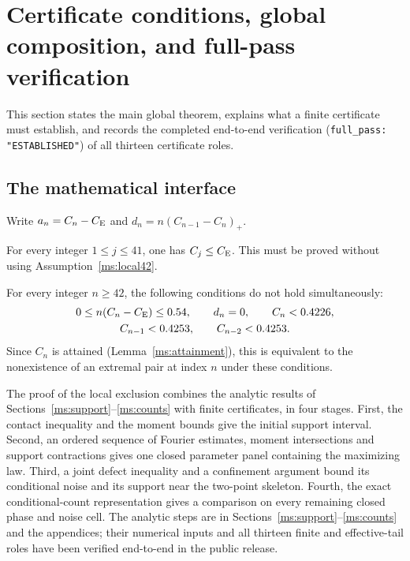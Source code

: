 \section{Certificate conditions, global composition, and full-pass verification}\label{ms:certificates}

This section states the main global theorem, explains what a
finite certificate must establish, and records the completed end-to-end
verification (\texttt{full\_pass: "ESTABLISHED"}) of all thirteen certificate
roles.

\subsection{The mathematical interface}

Write $a_n=C_n-C_{\mathrm E}$ and
$d_n=n(C_{n-1}-C_n)_+$.

\begin{assumption}\label{ms:base41}
For every integer $1\le j\le41$, one has $C_j\le C_{\mathrm E}$.
This must be proved without using Assumption~\ref{ms:local42}.
\end{assumption}

\begin{assumption}\label{ms:local42}
For every integer $n\ge42$, the following conditions do not hold
simultaneously:
\begin{equation}\label{ms:local-entry}
 \begin{gathered}
 0\le n(C_n-C_{\mathrm E})\le0.54,\qquad d_n=0,\qquad C_n<0.4226,\\
 C_{n-1}<0.4253,\qquad C_{n-2}<0.4253.
 \end{gathered}
\end{equation}
Since $C_n$ is attained (Lemma~\ref{ms:attainment}), this is equivalent to
the nonexistence of an extremal pair at index $n$ under these conditions.
\end{assumption}

The proof of the local exclusion combines the analytic results of
Sections~\ref{ms:support}--\ref{ms:counts} with finite certificates, in
four stages. First, the contact inequality and the moment
bounds give the initial support interval. Second, an ordered sequence of
Fourier estimates, moment intersections and support contractions gives
one closed parameter panel containing the maximizing law. Third, a joint
defect inequality and a confinement argument bound its conditional noise
and its support near the two-point skeleton. Fourth, the exact
conditional-count representation gives a comparison on every remaining
closed phase and noise cell. The analytic steps are in Sections~\ref{ms:support}--\ref{ms:counts}
and the appendices; their numerical inputs and all thirteen finite and
effective-tail roles have been verified end-to-end in the public release.

